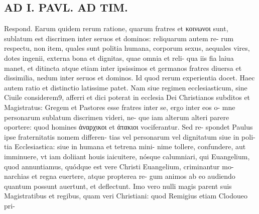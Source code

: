 \documentclass{article}
\begin{document}
\begin{pages}
\section*{AD I. PAVL. AD TIM. }
\marginpar{[ p.420 ]}\pstart Respond. Earum quidem rerum ratione, quarum fratres et κοινωνοι sunt, sublatum est discrimen inter seruos et dominos: reliquarum autem re- rum respectu, non item, quales sunt politia humana, corporum sexus, aequales vires, dotes ingenii, externa bona et dignitas, quae omnia et reli- qua iis fia laiua manet, et ditincta atque  etiam inter ipsissimos et germanos fratres diuersa et dissimilia, nedum inter seruos et dominos. Id quod rerum experientia docet.  \pend\pstart Haec autem ratio et distinctio latissime patet. Nam siue regimen ecclesiasticum, sine Ciuile considerem9, afferri et dici poterat in ecclesia Dei Christianos subditos et Magistratus: Gregem et Pastores esse fratres inter se, ergo inter eos o- mne personarum sublatum discrimen videri, ne- que iam alterum alteri parere oportere: quod homines ἀναρχικοι et ἀτακιοι vociferantur. Sed re- spondet Paulus ipse fraternitatis nomem differen- tias vel personarum vel dignitatum siue in poli- tia Ecclesiastica: siue in humana et tetrena mini- nime tollere, confundere, aut imminuere, vt iam doliiant houis iaicuitere, nósque calumniari, qui Euangelium, quod annuntiamus, quódque est vere Christi Euangelium, criminantur mo- narchias et regna euertere, atque propterea re- gum animos ab eo audiendo quantum possunt auertunt, et deflectunt. Imo vero nulli magis parent suis Magistratibus et regibus, quam veri Christiani: quod Remigius etiam Clodoueo pri-  \pend

\end{pages}
\end{document}
